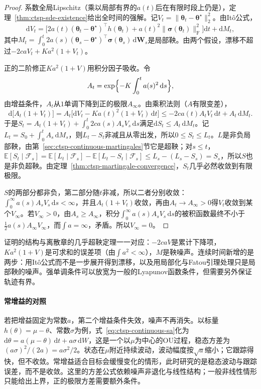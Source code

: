 \begin{proof}
系数全局Lipschitz（乘以局部有界的$a(t)$后在有限时段上仍是），定理~\ref{thm:ctsp-sde-existence}给出全时间的强解。记$V_t=\|\bm\theta_t-\bm\theta^\star\|_2^2$。由Itô公式，
\[
  \mathrm dV_t=\bigl[2a(t)(\bm\theta_t-\bm\theta^\star)^\top h(\bm\theta_t)+a(t)^2\|\bm\sigma(\bm\theta_t)\|_{\mathrm F}^2\bigr]\mathrm dt+\mathrm dM_t ,
\]
其中$M_t=\int_0^t2a(s)(\bm\theta_s-\bm\theta^\star)^\top\bm\sigma(\bm\theta_s)\,\mathrm d\bm W_s$是局部鞅。由两个假设，漂移不超过$-2caV_t+Ka^2(1+V_t)$。

正的二阶修正$Ka^2(1+V)$用积分因子吸收。令
\[
  A_t=\exp\Bigl\{-K\int_0^ta(s)^2\,\mathrm ds\Bigr\},
\]
由增益条件，$A_t$从$1$单调下降到正的极限$A_\infty$。由乘积法则（$A$有限变差），
\[
  \mathrm d\bigl[A_t(1+V_t)\bigr]=A_t\bigl[\mathrm dV_t-Ka(t)^2(1+V_t)\,\mathrm dt\bigr]\leq-2ca(t)A_tV_t\,\mathrm dt+A_t\,\mathrm dM_t .
\]
于是$S_t=A_t(1+V_t)+\int_0^t2ca(s)A_sV_s\,\mathrm ds$满足$\mathrm dS_t\leq A_t\,\mathrm dM_t$。记$L_t=S_0+\int_0^tA_s\,\mathrm dM_s$，则$L_t-S_t$非减且从零出发，所以$0\leq S_t\leq L_t$。$L$是非负局部鞅，由第~\ref{sec:ctsp-continuous-martingales}节它是超鞅；对$s\leq t$，$\mathbb E[S_t\mid\mathcal F_s]=\mathbb E[L_t\mid\mathcal F_s]-\mathbb E[L_t-S_t\mid\mathcal F_s]\leq L_s-(L_s-S_s)=S_s$，所以$S$也是非负超鞅。由定理~\ref{thm:ctsp-martingale-convergence}，$S_t$几乎必然收敛到有限极限。

$S$的两部分都非负，第二部分随$t$非减，所以二者分别收敛：$\int_0^\infty a(s)A_sV_s\,\mathrm ds<\infty$，并且$A_t(1+V_t)$收敛，再由$A_t\to A_\infty>0$得$V_t$收敛到某个$V_\infty$。若$V_\infty>0$，由$A_s\geq A_\infty$，积分$\int_0^\infty a(s)A_sV_s\,\mathrm ds$的被积函数最终不小于$\frac12a(s)A_\infty V_\infty$，而$\int a=\infty$，矛盾。所以$V_\infty=0$。
\end{proof}

证明的结构与离散章的几乎超鞅定理一一对应：$-2caV$是累计下降项，$Ka^2(1+V)$是可求和的误差项（由$\int a^2<\infty$），$M$是鞅噪声。连续时间新增的是两步：用Itô公式而不是一步展开得到漂移，以及用局部化与Fatou引理处理只是局部鞅的噪声。强单调条件可以放宽为一般的Lyapunov函数条件，但需要另外保证轨迹有界。

\paragraph{常增益的对照}
若把增益固定为常数$a$，第二个增益条件失效，噪声不再消失。以标量$h(\theta)=\mu-\theta$、常数$\sigma$为例，式~\eqref{eq:ctsp-continuous-sa}化为$\mathrm d\theta=a(\mu-\theta)\,\mathrm dt+a\sigma\,\mathrm dW$，这是一个以$\mu$为中心的OU过程，稳态方差为$(a\sigma)^2/(2a)=a\sigma^2/2$。状态在$\mu$附近持续波动，波动幅度按$\sqrt a$缩小；它跟踪得快，但不收敛。常增益适合目标会缓慢变化的情形，此时研究的是稳态波动与跟踪误差，而不是收敛。这里的方差公式依赖噪声非退化与线性结构；一般非线性情形只能给出上界，正的极限方差需要额外条件。

